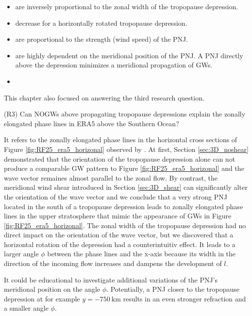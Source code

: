 \begin{itemize}
    \item are inversely proportional to the zonal width of the tropopause depression.
    \item decrease for a horizontally rotated tropopause depression.
    \item are proportional to the strength (wind speed) of the PNJ.
    \item are highly dependent on the meridional position of the PNJ. A PNJ directly above the depression minimizes a meridional propagation of GWs.
    \item 
\end{itemize}
This chapter also focused on answering the third research question.
\begin{tcolorbox}[]
    (R3) Can NOGWs above propagating tropopause depressions explain the zonally elongated phase lines in ERA5 above the Southern Ocean?
\end{tcolorbox}
It refers to the zonally elongated phase lines in the horizontal cross sections of Figure \ref{fig:RF25_era5_horizonal} observed by \textcite[]{dornbrack_stratospheric_2022}. At first, Section \ref{sec:3D_noshear} demonstrated that the orientation of the tropopause depression alone can not produce a comparable GW pattern to Figure \ref{fig:RF25_era5_horizonal} and the wave vector remaines almost parallel to the zonal flow. By contrast, the meridional wind shear introduced in Section \ref{sec:3D_shear} can significantly alter the orientation of the wave vector and we conclude that a very strong PNJ located in the south of a tropopause depression leads to zonally elongated phase lines in the upper stratosphere that mimic the appearance of GWs in Figure \ref{fig:RF25_era5_horizonal}. The zonal width of the tropopause depression had no direct impact on the orientation of the wave vector, but we discovered that a horizontal rotation of the depression had a counterintuitiv effect. It leads to a larger angle $\phi$ between the phase lines and the x-axis because its width in the direction of the incoming flow increases and dampens the development of $l$. 

It could be educational to investigate additional variations of the PNJ's meridional position on the angle $\phi$. Potentially, a PNJ closer to the tropopause depression at for example $y=\SI{-750}{\kilo\meter}$ results in an even stronger refraction and a smaller angle $\phi$.


